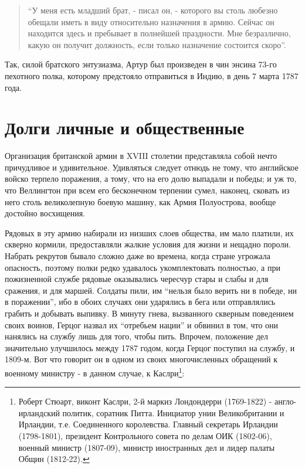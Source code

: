 \documentclass[
  oneside,
  12pt,
  titlepage]{book}
\begin{document}
\begin{quote}
``У меня есть младший брат, - писал он, - которого вы столь любезно обещали иметь в виду относительно назначения в армию. Сейчас он находится здесь и пребывает в полнейшей праздности. Мне безразлично, какую он получит должность, если только назначение состоится скоро''.
\end{quote}

Так, силой братского энтузиазма, Артур был произведен в чин энсина 73-го пехотного полка, которому предстояло отправиться в Индию, в день 7 марта 1787 года.

\hypertarget{ux434ux43eux43bux433ux438-ux43bux438ux447ux43dux44bux435-ux438-ux43eux431ux449ux435ux441ux442ux432ux435ux43dux43dux44bux435}{%
\chapter{Долги личные и общественные}\label{ux434ux43eux43bux433ux438-ux43bux438ux447ux43dux44bux435-ux438-ux43eux431ux449ux435ux441ux442ux432ux435ux43dux43dux44bux435}}

Организация британской армии в XVIII столетии представляла собой нечто причудливое и удивительное. Удивляться следует отнюдь не тому, что английское войско терпело поражения, а тому, что на его долю выпадали и победы; и уж то, что Веллингтон при всем его бесконечном терпении сумел, наконец, сковать из него столь великолепную боевую машину, как Армия Полуострова, вообще достойно восхищения.

Рядовых в эту армию набирали из низших слоев общества, им мало платили, их скверно кормили, предоставляли жалкие условия для жизни и нещадно пороли. Набрать рекрутов бывало сложно даже во времена, когда стране угрожала опасность, поэтому полки редко удавалось укомплектовать полностью, а при пожизненной службе рядовые оказывались чересчур стары и слабы и для сражения, и для маршей. Солдаты пили, им ``нельзя было верить ни в победе, ни в поражении'', ибо в обоих случаях они ударялись в бега или отправлялись грабить и добывать выпивку. В минуту гнева, вызванного скверным поведением своих воинов, Герцог назвал их ``отребьем нации'' и обвинил в том, что они нанялись на службу лишь для того, чтобы пить. Впрочем, положение дел значительно улучшилось между 1787 годом, когда Герцог поступил на службу, и 1809-м. Вот что говорит он в одном из своих многочисленных обращений к военному министру - в данном случае, к Каслри\footnote{Роберт Стюарт, виконт Каслри, 2-й маркиз Лондондерри (1769-1822) - англо-ирландский политик, соратник Питта. Инициатор унии Великобритании и Ирландии, т.е. Соединенного королевства. Главный секретарь Ирландии (1798-1801), президент Контрольного совета по делам ОИК (1802-06), военный министр (1807-09), министр иностранных дел и лидер палаты Общин (1812-22).}:
\end{document}
